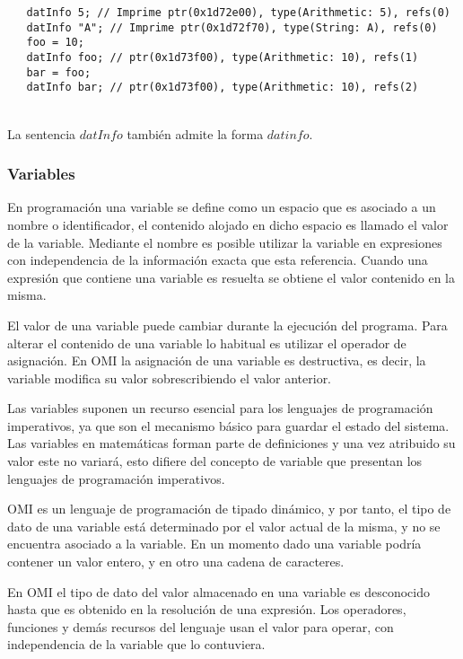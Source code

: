 \begin{lstlisting}
   datInfo 5; // Imprime ptr(0x1d72e00), type(Arithmetic: 5), refs(0)
   datInfo "A"; // Imprime ptr(0x1d72f70), type(String: A), refs(0)
   foo = 10;
   datInfo foo; // ptr(0x1d73f00), type(Arithmetic: 10), refs(1)
   bar = foo;
   datInfo bar; // ptr(0x1d73f00), type(Arithmetic: 10), refs(2)
\end{lstlisting}
\hfill\\

La sentencia $datInfo$ también admite la forma $datinfo$.

\subsubsection{Variables}
En programación una variable se define como un espacio que es asociado a un nombre o identificador, el contenido alojado en dicho espacio es llamado el valor de la variable.
Mediante el nombre es posible utilizar la variable en expresiones con independencia de la información exacta que esta referencia. Cuando una expresión que contiene una variable es resuelta
se obtiene el valor contenido en la misma. 

El valor de una variable puede cambiar durante la ejecución del programa. Para alterar el contenido de una variable lo habitual es utilizar el operador de asignación. 
En OMI la asignación de una variable es destructiva, es decir, la variable modifica su valor sobrescribiendo el valor anterior. 

Las variables suponen un recurso esencial para los lenguajes de programación imperativos, ya que son el mecanismo básico para guardar el estado del sistema. Las variables en matemáticas
forman parte de definiciones y una vez atribuido su valor este no variará, esto difiere del concepto de variable que presentan los lenguajes de programación imperativos. 


OMI es un lenguaje de programación de tipado dinámico, y por tanto, el tipo de dato de una variable está determinado por el valor actual de la misma, y no se encuentra 
asociado a la variable. En un momento dado una variable podría contener un valor entero, y en otro una cadena de caracteres. 

En OMI el tipo de dato del valor almacenado en una variable es desconocido hasta que es obtenido en la resolución de una expresión. Los operadores, funciones y demás recursos
del lenguaje usan el valor para operar, con independencia de la variable que lo contuviera.


